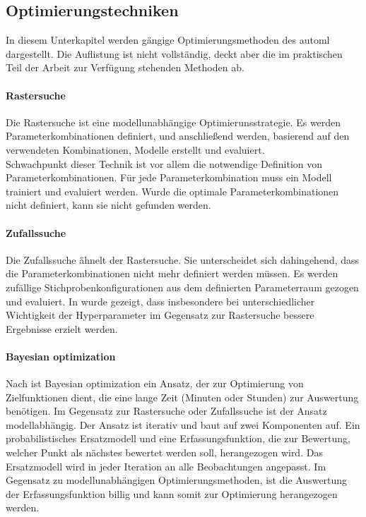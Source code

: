	\subsection{Optimierungstechniken}
	\label{subsec:Optimierungstechniken}
	In diesem Unterkapitel werden gängige Optimierungsmethoden des \ac{automl} dargestellt. Die Auflistung ist nicht vollständig, deckt aber die im praktischen Teil der Arbeit zur Verfügung stehenden Methoden ab.  
	
	\paragraph{Rastersuche}
	Die Rastersuche \cite{Michelucci.2018} ist eine modellunabhängige Optimierunsstrategie. Es werden Parameterkombinationen definiert, und anschließend werden, basierend auf den verwendeten Kombinationen, Modelle erstellt und evaluiert. \\ Schwachpunkt dieser Technik ist vor allem die notwendige Definition von Parameterkombinationen. Für jede Parameterkombination muss ein Modell trainiert und evaluiert werden. Wurde die optimale  Parameterkombinationen nicht definiert, kann sie nicht gefunden werden.
	 
	\paragraph{Zufallssuche}
	Die Zufallssuche ähnelt der Rastersuche. Sie unterscheidet sich dahingehend, dass die Parameterkombinationen nicht mehr definiert werden müssen. Es werden zufällige Stichprobenkonfigurationen aus dem definierten Parameterraum gezogen und evaluiert. In \cite{BergstraJamesandYoshuaBengio..2012} wurde gezeigt, dass insbesondere bei unterschiedlicher Wichtigkeit der Hyperparameter im Gegensatz zur Rastersuche bessere Ergebnisse erzielt werden. 

	\paragraph{Bayesian optimization}
	Nach \cite{Frazier.201807} ist Bayesian optimization ein Ansatz, der zur Optimierung von Zielfunktionen dient, die eine lange Zeit (Minuten oder Stunden) zur Auswertung benötigen. Im Gegensatz zur Rastersuche oder Zufallssuche ist der Ansatz modellabhängig. Der Ansatz ist iterativ und baut auf zwei Komponenten auf. Ein probabilistisches Ersatzmodell und eine Erfassungsfunktion, die zur Bewertung, welcher Punkt als nächstes bewertet werden soll, herangezogen wird. Das Ersatzmodell wird in jeder Iteration an alle Beobachtungen angepasst. Im Gegensatz zu modellunabhängigen Optimierungsmethoden, ist die Auswertung der Erfassungsfunktion billig und kann somit zur Optimierung herangezogen werden. 
	
